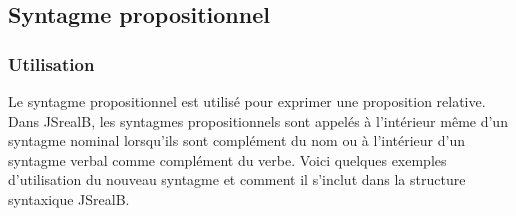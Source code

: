 \documentclass[11pt]{article} %
\newcommand{\system}[1]{\textsf{#1}}
\newcommand{\JSB}{\system{JSrealB}}
\begin{document}
\subsection{Syntagme propositionnel}
\label{syntProp}

\subsubsection{Utilisation}

Le syntagme propositionnel est utilisé pour exprimer une proposition
relative. Dans \JSB{}, les syntagmes propositionnels sont appelés
à l'intérieur même d'un syntagme nominal lorsqu'ils sont complément
du nom ou à l'intérieur d'un syntagme verbal comme complément du verbe.
Voici quelques exemples d'utilisation du nouveau syntagme et comment
il s'inclut dans la structure syntaxique \JSB{}.
\end{document}
